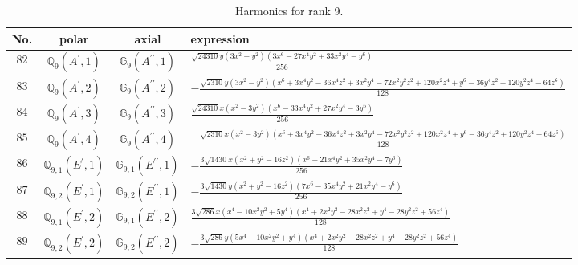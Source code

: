 \documentclass[fleqn,8pt,landscape]{jsarticle}
\begin{document}
\begin{table}[ht!]
\begin{center}
\caption{Harmonics for rank 9.}
\renewcommand{\arraystretch}{1.3}
\begin{tabular}{cccl} \hline \hline
No. & polar & axial & expression \\ \hline
$ 82 $ & $ \mathbb{Q}_{9}(A^{\prime},1) $ & $ \mathbb{G}_{9}(A^{\prime\prime},1) $ & $ \frac{\sqrt{24310} y \left(3 x^{2} - y^{2}\right) \left(3 x^{6} - 27 x^{4} y^{2} + 33 x^{2} y^{4} - y^{6}\right)}{256} $ \\
$ 83 $ & $ \mathbb{Q}_{9}(A^{\prime},2) $ & $ \mathbb{G}_{9}(A^{\prime\prime},2) $ & $ - \frac{\sqrt{2310} y \left(3 x^{2} - y^{2}\right) \left(x^{6} + 3 x^{4} y^{2} - 36 x^{4} z^{2} + 3 x^{2} y^{4} - 72 x^{2} y^{2} z^{2} + 120 x^{2} z^{4} + y^{6} - 36 y^{4} z^{2} + 120 y^{2} z^{4} - 64 z^{6}\right)}{128} $ \\
$ 84 $ & $ \mathbb{Q}_{9}(A^{\prime},3) $ & $ \mathbb{G}_{9}(A^{\prime\prime},3) $ & $ \frac{\sqrt{24310} x \left(x^{2} - 3 y^{2}\right) \left(x^{6} - 33 x^{4} y^{2} + 27 x^{2} y^{4} - 3 y^{6}\right)}{256} $ \\
$ 85 $ & $ \mathbb{Q}_{9}(A^{\prime},4) $ & $ \mathbb{G}_{9}(A^{\prime\prime},4) $ & $ - \frac{\sqrt{2310} x \left(x^{2} - 3 y^{2}\right) \left(x^{6} + 3 x^{4} y^{2} - 36 x^{4} z^{2} + 3 x^{2} y^{4} - 72 x^{2} y^{2} z^{2} + 120 x^{2} z^{4} + y^{6} - 36 y^{4} z^{2} + 120 y^{2} z^{4} - 64 z^{6}\right)}{128} $ \\
$ 86 $ & $ \mathbb{Q}_{9,1}(E^{\prime},1) $ & $ \mathbb{G}_{9,1}(E^{\prime\prime},1) $ & $ - \frac{3 \sqrt{1430} x \left(x^{2} + y^{2} - 16 z^{2}\right) \left(x^{6} - 21 x^{4} y^{2} + 35 x^{2} y^{4} - 7 y^{6}\right)}{256} $ \\
$ 87 $ & $ \mathbb{Q}_{9,2}(E^{\prime},1) $ & $ \mathbb{G}_{9,2}(E^{\prime\prime},1) $ & $ - \frac{3 \sqrt{1430} y \left(x^{2} + y^{2} - 16 z^{2}\right) \left(7 x^{6} - 35 x^{4} y^{2} + 21 x^{2} y^{4} - y^{6}\right)}{256} $ \\
$ 88 $ & $ \mathbb{Q}_{9,1}(E^{\prime},2) $ & $ \mathbb{G}_{9,1}(E^{\prime\prime},2) $ & $ \frac{3 \sqrt{286} x \left(x^{4} - 10 x^{2} y^{2} + 5 y^{4}\right) \left(x^{4} + 2 x^{2} y^{2} - 28 x^{2} z^{2} + y^{4} - 28 y^{2} z^{2} + 56 z^{4}\right)}{128} $ \\
$ 89 $ & $ \mathbb{Q}_{9,2}(E^{\prime},2) $ & $ \mathbb{G}_{9,2}(E^{\prime\prime},2) $ & $ - \frac{3 \sqrt{286} y \left(5 x^{4} - 10 x^{2} y^{2} + y^{4}\right) \left(x^{4} + 2 x^{2} y^{2} - 28 x^{2} z^{2} + y^{4} - 28 y^{2} z^{2} + 56 z^{4}\right)}{128} $ \\

\end{tabular}
\end{center}
\end{table}
\end{document}
